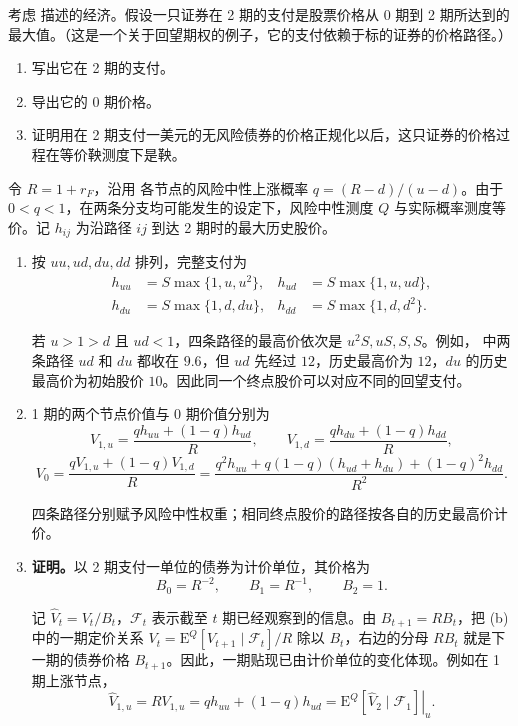\begin{problem}
\WJFiveProblem{} 考虑 描述的经济。假设一只证券在 2 期的支付是股票价格从 0 期到 2 期所达到的最大值。（这是一个关于回望期权的例子，它的支付依赖于标的证券的价格路径。）
\begin{enumerate}[label=(\alph*)]
    \item 写出它在 2 期的支付。
    \item 导出它的 0 期价格。
    \item 证明用在 2 期支付一美元的无风险债券的价格正规化以后，这只证券的价格过程在等价鞅测度下是鞅。
\end{enumerate}
\end{problem}
\begin{solution}[blank-type=manual,blank-vsep=9\baselineskip]

令 $R=1+r_F$，沿用 各节点的风险中性上涨概率 $q=(R-d)/(u-d)$。由于 $0<q<1$，在两条分支均可能发生的设定下，风险中性测度 $Q$ 与实际概率测度等价。记 $h_{ij}$ 为沿路径 $ij$ 到达 2 期时的最大历史股价。
\begin{enumerate}[label=(\alph*)]
 \item 按 $uu,ud,du,dd$ 排列，完整支付为
 \[
 \begin{aligned}
 h_{uu}&=S\max\{1,u,u^2\},&h_{ud}&=S\max\{1,u,ud\},\\
 h_{du}&=S\max\{1,d,du\},&h_{dd}&=S\max\{1,d,d^2\}.
 \end{aligned}
 \]

 若 $u>1>d$ 且 $ud<1$，四条路径的最高价依次是 $u^2S,uS,S,S$。例如， 中两条路径 $ud$ 和 $du$ 都收在 $9.6$，但 $ud$ 先经过 $12$，历史最高价为 $12$，$du$ 的历史最高价为初始股价 $10$。因此同一个终点股价可以对应不同的回望支付。

 \item 1 期的两个节点价值与 0 期价值分别为
 \[
 V_{1,u}=\frac{qh_{uu}+(1-q)h_{ud}}R,\qquad
 V_{1,d}=\frac{qh_{du}+(1-q)h_{dd}}R,
 \]
 \[
 V_0=\frac{qV_{1,u}+(1-q)V_{1,d}}R
 =\frac{q^2h_{uu}+q(1-q)(h_{ud}+h_{du})+(1-q)^2h_{dd}}{R^2}.
 \]

 四条路径分别赋予风险中性权重；相同终点股价的路径按各自的历史最高价计价。

 \item \textbf{证明。}以 2 期支付一单位的债券为计价单位，其价格为
 \[
 B_0=R^{-2},\qquad B_1=R^{-1},\qquad B_2=1.
 \]

 记 $\widehat V_t=V_t/B_t$，$\mathcal F_t$ 表示截至 $t$ 期已经观察到的信息。由 $B_{t+1}=RB_t$，把 (b) 中的一期定价关系 $V_t=\mathrm E^Q[V_{t+1}\mid\mathcal F_t]/R$ 除以 $B_t$，右边的分母 $RB_t$ 就是下一期的债券价格 $B_{t+1}$。因此，一期贴现已由计价单位的变化体现。例如在 1 期上涨节点，
 \[
 \widehat V_{1,u}=RV_{1,u}=qh_{uu}+(1-q)h_{ud}
 =\left.\mathrm E^Q[\widehat V_2\mid\mathcal F_1]\right|_u.
 \]


\end{enumerate}
\end{solution}
